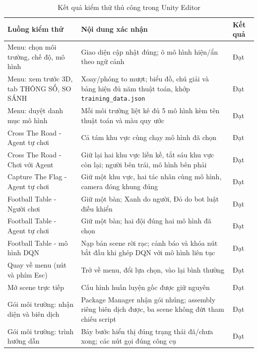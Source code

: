 \begin{table}[H]
\centering
\caption{Kết quả kiểm thử thủ công trong Unity Editor}
\label{tab:app_test}
\renewcommand{\arraystretch}{1.3}
\tablefont
\begin{tabular}{|p{5.6cm}|p{5.6cm}|>{\centering\arraybackslash}p{2.4cm}|}
\hline
\textbf{Luồng kiểm thử} & \textbf{Nội dung xác nhận} & \textbf{Kết quả} \\
\hline
Menu: chọn môi trường, chế độ, mô hình & Giao diện cập nhật đúng; ô mô hình
hiện/ẩn theo ngữ cảnh & Đạt \\
\hline
Menu: xem trước 3D, tab THÔNG SỐ, SO SÁNH & Xoay/phóng to mượt; biểu đồ, chú giải và
bảng hiện đủ năm thuật toán, khớp \texttt{training\_data.json} & Đạt \\
\hline
Menu: duyệt danh mục mô hình & Mỗi môi trường liệt kê đủ 5 mô hình kèm tên thuật
toán và màu quy ước & Đạt \\
\hline
Cross The Road - Agent tự chơi & Cả tám khu vực cùng chạy mô hình đã chọn & Đạt \\
\hline
Cross The Road - Chơi với Agent & Giữ lại hai khu vực liền kề, tắt sáu khu vực còn
lại; người bên trái, mô hình bên phải & Đạt \\
\hline
Capture The Flag - Agent tự chơi & Giữ một khu vực, hai tác nhân cùng mô hình,
camera đóng khung đúng & Đạt \\
\hline
Football Table - Người chơi & Giữ một bàn; Xanh do người, Đỏ do bot luật điều
khiển & Đạt \\
\hline
Football Table - Agent tự chơi & Giữ một bàn; hai đội đúng hai mô hình đã chọn
& Đạt \\
\hline
Football Table - mô hình DQN & Nạp bản scene rời rạc; cảnh báo và khóa nút bắt đầu
khi ghép DQN với mô hình liên tục & Đạt \\
\hline
Quay về menu (nút và phím Esc) & Trở về menu, đổi lựa chọn, vào lại bình
thường & Đạt \\
\hline
Mở scene trực tiếp & Cấu hình huấn luyện gốc được giữ
nguyên & Đạt \\
\hline
Gói môi trường: nhận diện và biên dịch & Package Manager nhận gói nhúng; assembly
riêng biên dịch được, ba scene không đứt tham chiếu script & Đạt \\
\hline
Gói môi trường: trình hướng dẫn & Bảy bước hiển thị đúng trạng thái đã/chưa xong;
các nút gọi đúng công cụ & Đạt \\
\hline
\end{tabular}
\end{table}

